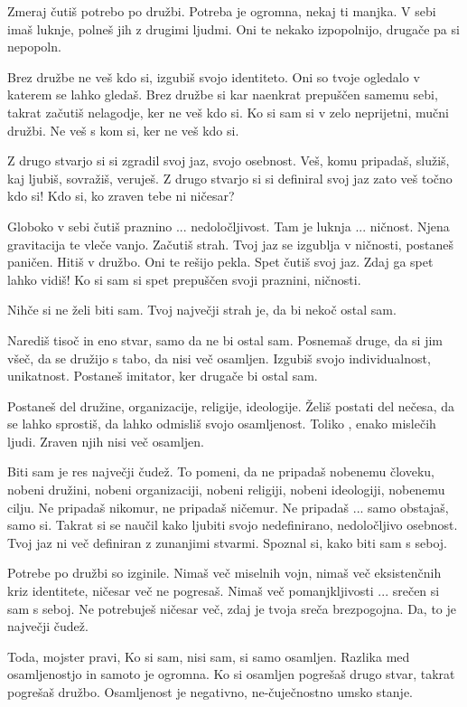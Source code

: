         

   Zmeraj čutiš potrebo po družbi. Potreba je ogromna, nekaj ti manjka. V sebi imaš luknje, polneš jih z drugimi ljudmi. Oni te nekako izpopolnijo, drugače pa si nepopoln. 

Brez družbe ne veš kdo si, izgubiš svojo identiteto. Oni so tvoje ogledalo v katerem se lahko gledaš. Brez družbe si kar naenkrat prepuščen samemu sebi, takrat začutiš nelagodje, ker ne veš kdo si. Ko si sam si v zelo neprijetni, mučni družbi. Ne veš s kom si, ker ne veš kdo si. 

Z drugo stvarjo si si zgradil svoj jaz, svojo osebnost. Veš, komu pripadaš, služiš, kaj ljubiš, sovražiš, veruješ. Z drugo stvarjo si si definiral svoj jaz zato veš točno kdo si! Kdo si, ko zraven tebe ni ničesar? 

Globoko v sebi čutiš praznino ... nedoločljivost. Tam je luknja ... ničnost. Njena gravitacija te vleče vanjo. Začutiš strah. Tvoj jaz se izgublja v ničnosti, postaneš paničen. Hitiš v družbo. Oni te rešijo pekla. Spet čutiš svoj jaz. Zdaj ga spet lahko vidiš! Ko si sam si spet prepuščen svoji praznini, ničnosti. 

Nihče si ne želi biti sam. Tvoj največji strah je, da bi nekoč ostal sam. 

Narediš tisoč in eno stvar, samo da ne bi ostal sam. Posnemaš druge, da si jim všeč, da se družijo s tabo, da nisi več osamljen. Izgubiš svojo individualnost, unikatnost. Postaneš imitator, ker drugače bi ostal sam. 

Postaneš del družine, organizacije, religije, ideologije. Želiš postati del nečesa, da se lahko sprostiš, da lahko odmisliš svojo osamljenost. Toliko , enako mislečih ljudi. Zraven njih nisi več osamljen. 

Biti sam je res največji čudež. To pomeni, da ne pripadaš nobenemu človeku, nobeni družini, nobeni organizaciji, nobeni religiji, nobeni ideologiji, nobenemu cilju. Ne pripadaš nikomur, ne pripadaš ničemur. Ne pripadaš ... samo obstajaš, samo si. Takrat si se naučil kako ljubiti svojo nedefinirano, nedoločljivo osebnost. Tvoj jaz ni več definiran z zunanjimi stvarmi. Spoznal si, kako biti sam s seboj. 

Potrebe po družbi so izginile. Nimaš več miselnih vojn, nimaš več eksistenčnih kriz identitete, ničesar več ne pogresaš. Nimaš več pomanjkljivosti ... srečen si sam s seboj. Ne potrebuješ ničesar več, zdaj je tvoja sreča brezpogojna. Da, to je največji čudež. 

Toda, mojster pravi,  Ko si sam, nisi sam, si samo osamljen. Razlika med osamljenostjo in samoto je ogromna. Ko si osamljen pogrešaš drugo stvar, takrat pogrešaš družbo. Osamljenost je negativno, ne-čuječnostno umsko stanje. 

